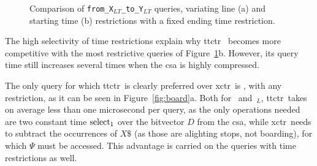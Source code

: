 \begin{figure}[ht]
\begin{subfigure}{0.5\linewidth}
    \vspace{-12pt}
    \caption{}
    \vspace{-12pt}
    \end{subfigure}
    \caption{Comparison of \texttt{from\_X$_{LT}$\_to\_Y$_{LT}$} queries, variating line (a) and starting time (b) restrictions with a fixed ending time restriction.}
    \label{fig:xy2}
    \end{figure}
    
    The high selectivity of time restrictions explain why \gls{ttctr}~ becomes more competitive with the most restrictive queries of Figure~\ref{fig:xy2}b. However, its query time still increases several times when the \gls{csa} is highly compressed.
    
    \medskip
    The only query for which \gls{ttctr}~is clearly preferred over \gls{xctr}~is \boardX, with any restriction, as it can be seen in Figure~\ref{fig:board}a. Both for \boardX~and~\boardX$_{L}$, \gls{ttctr}~takes on average less than one microsecond per query, as the only operations needed are two constant time $\operatorname{select}_1$ over the bitvector $D$ from the \gls{csa}, while \gls{xctr}~needs to subtract the occurrences of $X\$$ (as those are alighting stops, not boarding), for which $\Psi$ must be accessed. This advantage is carried on the queries with time restrictions as well.
    
